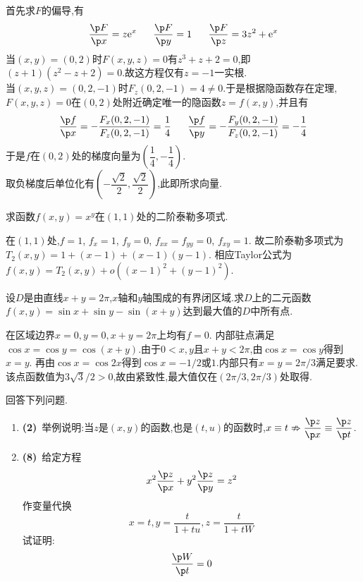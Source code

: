 \documentclass{ctexart}
\begin{document}
\begin{solution}
首先求$F$的偏导,有\[\dfrac{\p F}{\p x}=z\e^x\ \ \ \ \ \dfrac{\p F}{\p y}=1\ \ \ \ \ \dfrac{\p F}{\p z}=3z^2+\e^x\]
    当$(x,y)=(0,2)$时$F(x,y,z)=0$有$z^3+z+2=0$,即$(z+1)(z^2-z+2)=0$.故这方程仅有$z=-1$一实根.\\
    当$(x,y,z)=(0,2,-1)$时$F_z(0,2,-1)=4\neq0$.于是根据隐函数存在定理,$F(x,y,z)=0$在$(0,2)$处附近确定唯一的隐函数$z=f(x,y)$,并且有
    \[\dfrac{\p f}{\p x}=-\dfrac{F_x(0,2,-1)}{F_z(0,2,-1)}=\dfrac14\ \ \ \ \ \dfrac{\p f}{\p y}=-\dfrac{F_y(0,2,-1)}{F_z(0,2,-1)}=-\dfrac14\]
    于是$f$在$(0,2)$处的梯度向量为$\left(\dfrac14,-\dfrac14\right)$.\\
    取负梯度后单位化有$\left(-\dfrac{\sqrt2}{2},\dfrac{\sqrt2}{2}\right)$,此即所求向量.
\end{solution}
\begin{problem}[5.(10\songti{分})]
求函数$f(x,y)=x^y$在$(1,1)$处的二阶泰勒多项式.
\end{problem}
\begin{solution}
在$(1,1)$处,$f=1$, $f_x=1$, $f_y=0$, $f_{xx}=f_{yy}=0$, $f_{xy}=1$.
故二阶泰勒多项式为$T_2(x,y)=1+(x-1)+(x-1)(y-1)$.
相应Taylor公式为$f(x,y)=T_2(x,y)+o((x-1)^2+(y-1)^2)$.
\end{solution}
\begin{problem}[6.(10\songti{分})]
设$D$是由直线$x+y=2\pi$,$x$轴和$y$轴围成的有界闭区域.求$D$上的二元函数$f(x,y)=\sin x+\sin y-\sin(x+y)$达到最大值的$D$中所有点.
\end{problem}
\begin{solution}
在区域边界$x=0,y=0,x+y=2\pi$上均有$f=0$.
内部驻点满足$\cos x=\cos y=\cos(x+y)$.由于$0<x,y$且$x+y<2\pi$,由$\cos x=\cos y$得到$x=y$.
再由$\cos x=\cos2x$得到$\cos x=-1/2$或$1$.内部只有$x=y=2\pi/3$满足要求.
该点函数值为$3\sqrt3/2>0$,故由紧致性,最大值仅在$(2\pi/3,2\pi/3)$处取得.
\end{solution}
\begin{problem}[7.(10\songti{分})]
回答下列问题.
        \begin{enumerate}[label=\tbf{(\arabic*)}]
            \item \textbf{(2)}\ 举例说明:当$z$是$(x,y)$的函数,也是$(t,u)$的函数时,$x\equiv t\nRightarrow \dfrac{\p z}{\p x}\equiv\dfrac{\p z}{\p t}$.
            \item \textbf{(8)}\ 给定方程\[x^2\dfrac{\p z}{\p x}+y^2\dfrac{\p z}{\p y}=z^2\]作变量代换\[x=t,y=\dfrac{t}{1+tu},z=\dfrac{t}{1+tW}\]试证明:\[\dfrac{\p W}{\p t}=0\]
        \end{enumerate}
\end{problem}
\end{document}
